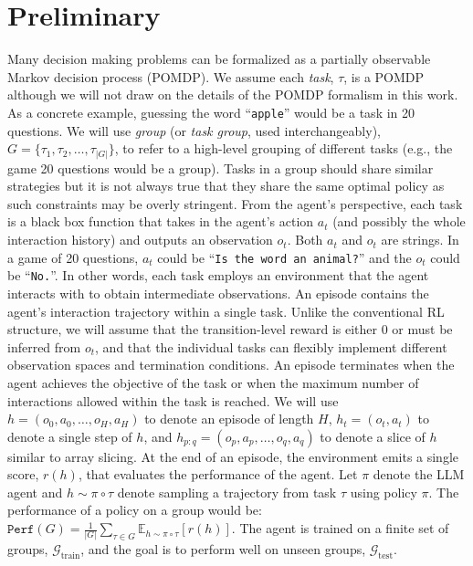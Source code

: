 \documentclass{article}
\def\gG{{\mathcal{G}}}
\newcommand{\E}{\mathbb{E}}
\theoremstyle{plain}
\theoremstyle{definition}
\theoremstyle{remark}
\begin{document}
\section{Preliminary}
Many decision making problems can be formalized as a partially observable Markov decision process (POMDP). We assume each \emph{task}, $\tau$, is a POMDP although we will not draw on the details of the POMDP formalism in this work. As a concrete example, guessing the word ``\texttt{apple}'' would be a task in 20 questions.
We will use \emph{group} (or \emph{task group}, used interchangeably), $G=\{\tau_1, \tau_2, \dots, \tau_{|G|}\}$, to refer to a high-level grouping of different tasks (e.g., the game 20 questions would be a group).
Tasks in a group should share similar strategies but it is not always true that they share the same optimal policy as such constraints may be overly stringent.
From the agent's perspective, each task is a black box function that takes in the agent's action $a_t$ (and possibly the whole interaction history) and outputs an observation $o_t$. Both $a_t$ and $o_t$ are strings. In a game of 20 questions, $a_t$ could be ``\texttt{Is the word an animal?}'' and the $o_t$ could be ``\texttt{No.}''. In other words, each task employs an environment that the agent interacts with to obtain intermediate observations.
An episode contains the agent's interaction trajectory within a single task.
Unlike the conventional RL structure, we will assume that the transition-level reward is either $0$ or must be inferred from $o_t$, and that the individual tasks can flexibly implement different observation spaces and termination conditions.
An episode terminates when the agent achieves the objective of the task or when the maximum number of interactions allowed within the task is reached.
We will use $h = (o_0, a_0, \dots, o_H, a_H)$ to denote an episode of length $H$, $h_t = (o_t, a_t)$ to denote a single step of $h$, and $h_{p:q} = (o_{p}, a_{p}, \dots, o_{q}, a_{q})$ to denote a slice of $h$ similar to array slicing.
At the end of an episode, the environment emits a single score, $r(h)$, that evaluates the performance of the agent.
Let $\pi$ denote the LLM agent and $h \sim \pi \circ \tau$ denote sampling a trajectory from task $\tau$ using policy $\pi$. The performance of a policy on a group would be:
$
    \texttt{Perf}(G) = \tfrac{1}{|G|}\sum_{\tau \in G} \E_{h\sim \pi \circ \tau}[r(h)].
$
The agent is trained on a finite set of groups, $\gG_\text{train}$, and the goal is to perform well on unseen groups, $\gG_\text{test}$.
\end{document}
